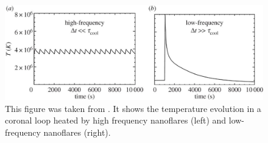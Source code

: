 \begin{figure}
    \centering
    \includegraphics[width=\textwidth]{figures/introduction/klimchuck_temperature.jpg}
    \vspace{-20pt}
    \caption{This figure was taken from \citet{Klimchuk2015}. It shows the temperature evolution in a coronal loop heated by high frequency nanoflares (left) and low-frequency nanoflares (right).}
    \label{fig:klimchuck_temperature}
\end{figure}

